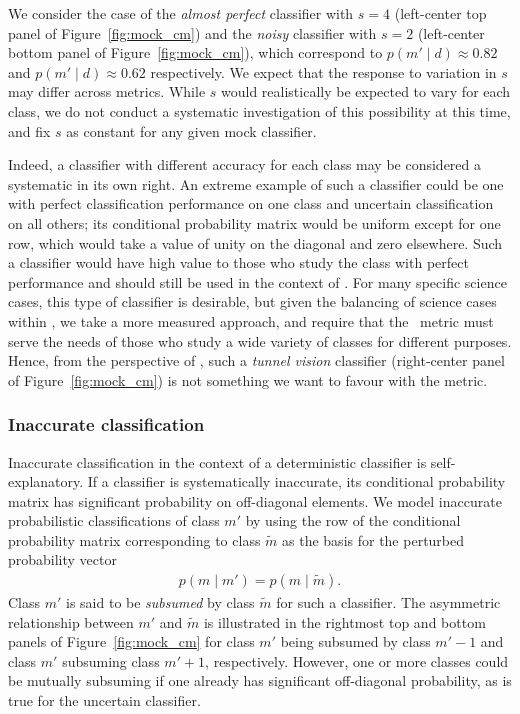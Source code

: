 We consider the case of the \textit{almost perfect} classifier with $s=4$ (left-center top panel of Figure~\ref{fig:mock_cm}) and the \textit{noisy} classifier with $s=2$ (left-center bottom panel of Figure~\ref{fig:mock_cm}), which correspond to $p(m' \mid d)\approx0.82$ and $p(m' \mid d)\approx0.62$ respectively. We expect that the response to variation in $s$ may differ across metrics.
While $s$ would realistically be expected to vary for each class, we do not conduct a systematic investigation of this possibility at this time, and fix $s$ as constant for any given mock classifier.

Indeed, a classifier with different accuracy for each class may be considered a systematic in its own right.
An extreme example of such a classifier could be one with perfect classification performance on one class and uncertain classification on all others; its conditional probability matrix would be uniform except for one row, which would take a value of unity on the diagonal and zero elsewhere.
Such a classifier would have high value to those who study the class with perfect performance and should still be used in the context of \lsst.
For many specific science cases, this type of classifier is desirable, but given the balancing of science cases within \lsst, we take a more measured approach, and require that the \plasticc\ metric must serve the needs of those who study a wide variety of classes for different purposes.
Hence, from the perspective of \plasticc, such a \textit{tunnel vision} classifier (right-center panel of Figure~\ref{fig:mock_cm}) is not something we want to favour with the metric.

\subsubsection{Inaccurate classification}
\label{sec:inaccuratedata}

Inaccurate classification in the context of a deterministic classifier is self-explanatory.
If a classifier is systematically inaccurate, its conditional probability matrix has significant probability on off-diagonal elements.
We model inaccurate probabilistic classifications of class $m'$ by using the row of the conditional probability matrix corresponding to class $\tilde{m}$ as the basis for the perturbed probability vector
\begin{eqnarray}
  \label{eq:subsume}
  p(m \mid m') = p(m \mid \tilde{m}).
\end{eqnarray}
Class $m'$ is said to be \textit{subsumed} by class $\tilde{m}$ for such a classifier.
The asymmetric relationship between $m'$ and $\tilde{m}$ is illustrated in the rightmost top and bottom panels of Figure~\ref{fig:mock_cm} for class $m'$ being subsumed by class $m'-1$ and class $m'$ subsuming class $m'+1$, respectively.
However, one or more classes could be mutually subsuming if one already has significant off-diagonal probability, as is true for the uncertain classifier.


